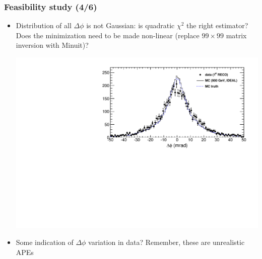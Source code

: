 \documentclass[compress]{beamer}
\begin{document}
\begin{frame}
\frametitle{Feasibility study (4/6)}
\begin{itemize}
\item Distribution of all $\Delta \phi$ is not Gaussian: is quadratic
  $\chi^2$ the right estimator?  Does the minimization need to be made
  non-linear (replace $99\times 99$ matrix inversion with Minuit)?

\includegraphics[width=\linewidth]{kaonTracking_deltaphi.pdf}

\item Some indication of $\Delta \phi$ variation in data?  Remember, these are unrealistic APEs
\end{itemize}
\end{frame}
\end{document}
